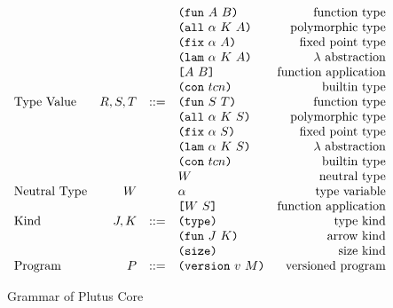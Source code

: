 \documentclass[../main.tex]{subfiles}
\begin{document}
\begin{figure*}[t]
\[\begin{array}{lrclr}
                                  &        &     & \texttt{(} \texttt{fun} ~ A ~ B \texttt{)}                & \textrm{function type}\\
                                  &        &     & \texttt{(} \texttt{all} ~ \alpha ~ K ~ A \texttt{)}        & \textrm{polymorphic type}\\
                                  &        &     & \texttt{(} \texttt{fix} ~ \alpha ~ A \texttt{)}           & \textrm{fixed point type}\\
                                  &        &     & \texttt{(} \texttt{lam} ~ \alpha ~ K ~ A \texttt{)}        & \textrm{$\lambda$ abstraction}\\
                                  &        &     & \texttt{[} A ~ B \texttt{]}                & \textrm{function application}\\
                                  &        &     & \texttt{(} \texttt{con} ~ tcn \texttt{)}                 & \textrm{builtin type}\\
        \textrm{Type Value}       & R,S,T  & ::= & \texttt{(} \texttt{fun} ~ S ~ T \texttt{)}                & \textrm{function type}\\
                                  &        &     & \texttt{(} \texttt{all} ~ \alpha ~ K ~ S \texttt{)}        & \textrm{polymorphic type}\\
                                  &        &     & \texttt{(} \texttt{fix} ~ \alpha ~ S \texttt{)}           & \textrm{fixed point type}\\
                                  &        &     & \texttt{(} \texttt{lam} ~ \alpha ~ K ~ S \texttt{)}        & \textrm{$\lambda$ abstraction}\\
                                  &        &     & \texttt{(} \texttt{con} ~ tcn \texttt{)}                 & \textrm{builtin type}\\
                                  &        &     & W                          & \textrm{neutral type}\\
        \textrm{Neutral Type}     & W      &     & \alpha                     & \textrm{type variable}\\
                                  &        &     & \texttt{[} W ~ S \texttt{]}                & \textrm{function application}\\
        \textrm{Kind}             & J,K    & ::= & \texttt{(} \texttt{type} \texttt{)}{}                   & \textrm{type kind}\\
                                  &        &     & \texttt{(} \texttt{fun} ~ J ~ K \texttt{)}                & \textrm{arrow kind}\\
                                  &        &     & \texttt{(} \texttt{size} \texttt{)}{}                   & \textrm{size kind}\\
        \textrm{Program}          & P      & ::= & \texttt{(} \texttt{version} ~ v ~ M \texttt{)}             & \textrm{versioned program}\\

    \end{array}\]
    \caption{Grammar of Plutus Core}
    \label{fig:Plutus_core_grammar}
\end{figure*}
\end{document}
